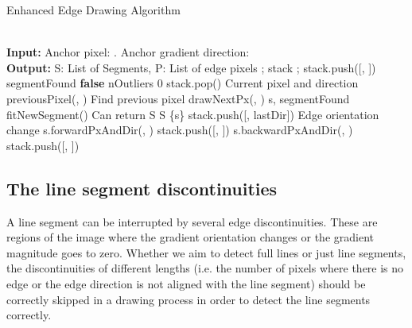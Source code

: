\documentclass[preprint,12pt]{elsarticle}
\begin{document}
\begin{algorithm}
	\caption{Enhanced Edge Drawing Algorithm}
    \label{alg:drawing-stack-algorithm}
\begin{algorithmic}[1]
\\ 
	\textbf{Input:} Anchor pixel: . Anchor gradient direction: \\ 
	\textbf{Output:} S: List of Segments, P: List of edge pixels
	\State  ; 
	\State stack  ; stack.push([, ])
	 \State segmentFound  \textbf{false}
		\State nOutliers  0
\State  stack.pop() \Comment Current pixel and direction
		\State  previousPixel(, ) \Comment Find previous pixel
		 \State   drawNextPx(, )
			\State 
				 \label{alg:addpxToSegment}
			\Else 
				\State s, segmentFound  fitNewSegment() \Comment Can return 
				\State S  S  \{s\}
			\EndIf
		\EndWhile
		\If{} 
			\State stack.push([, lastDir]) \label{alg:drawOtherDirection} \Comment Edge orientation change
			 \label{alg:canContinueFordward}
                \State  s.forwardPxAndDir(, )
				\State stack.push([, ]) 
			\EndIf  \label{alg:endCanContinueFordward}
			 \label{alg:canContinueBackward}
				\State  s.backwardPxAndDir(, )
				\State stack.push([, ]) 
			\EndIf \label{alg:endCanContinueBackward}
		\EndIf
	\EndWhile
\EndProcedure
\end{algorithmic}
\end{algorithm}

\subsection{The line segment discontinuities}
\label{sec:discontinuity_management}

A line segment can be interrupted by several edge discontinuities. These are regions of the image where the gradient orientation changes or the gradient magnitude goes to zero. Whether we aim to detect full lines or just line segments, the discontinuities of different lengths (i.e. the number of pixels where there is no edge or the edge direction is not aligned with the line segment) should be correctly skipped in a drawing process in order to detect the line segments correctly. 
\end{document}
